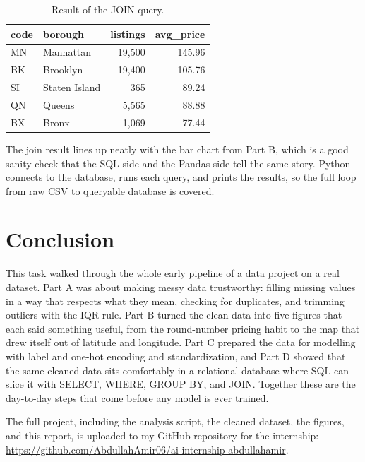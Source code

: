 \documentclass[11pt,a4paper]{article}
\begin{document}
\begin{table}[H]
\centering
\begin{tabular}{llrr}
\toprule
\textbf{code} & \textbf{borough} & \textbf{listings} & \textbf{avg\_price} \\
\midrule
MN & Manhattan     & 19{,}500 & 145.96 \\
BK & Brooklyn      & 19{,}400 & 105.76 \\
SI & Staten Island & 365      & 89.24 \\
QN & Queens        & 5{,}565  & 88.88 \\
BX & Bronx         & 1{,}069  & 77.44 \\
\bottomrule
\end{tabular}
\caption{Result of the JOIN query.}
\end{table}

The join result lines up neatly with the bar chart from Part B, which is a good sanity check that the SQL side and the Pandas side tell the same story. Python connects to the database, runs each query, and prints the results, so the full loop from raw CSV to queryable database is covered.

\section*{Conclusion}
This task walked through the whole early pipeline of a data project on a real dataset. Part A was about making messy data trustworthy: filling missing values in a way that respects what they mean, checking for duplicates, and trimming outliers with the IQR rule. Part B turned the clean data into five figures that each said something useful, from the round-number pricing habit to the map that drew itself out of latitude and longitude. Part C prepared the data for modelling with label and one-hot encoding and standardization, and Part D showed that the same cleaned data sits comfortably in a relational database where SQL can slice it with SELECT, WHERE, GROUP BY, and JOIN. Together these are the day-to-day steps that come before any model is ever trained.

The full project, including the analysis script, the cleaned dataset, the figures, and this report, is uploaded to my GitHub repository for the internship: \url{https://github.com/AbdullahAmir06/ai-internship-abdullahamir}.

\end{document}

